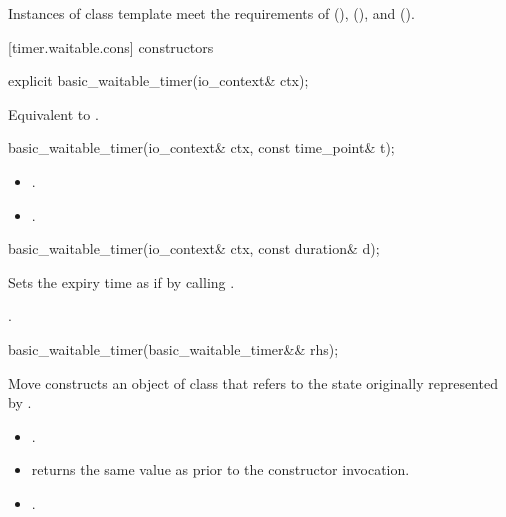 \pnum
Instances of class template  meet the requirements of  (),  (), and  ().


[timer.waitable.cons]{ constructors}

\begin{itemdecl}
explicit basic_waitable_timer(io_context& ctx);
\end{itemdecl}

\begin{itemdescr}
\pnum
\effects Equivalent to .
\end{itemdescr}

\begin{itemdecl}
basic_waitable_timer(io_context& ctx, const time_point& t);
\end{itemdecl}

\begin{itemdescr}
\pnum
\postconditions 
\begin{itemize}
\item
{}.
\item
{}.
\end{itemize}
\end{itemdescr}

\begin{itemdecl}
basic_waitable_timer(io_context& ctx, const duration& d);
\end{itemdecl}

\begin{itemdescr}
\pnum
\effects Sets the expiry time as if by calling .

\pnum
\postconditions {}.
\end{itemdescr}

\begin{itemdecl}
basic_waitable_timer(basic_waitable_timer&& rhs);
\end{itemdecl}

\begin{itemdescr}
\pnum
\effects Move constructs an object of class  that refers to the state originally represented by .

\pnum
\postconditions 
\begin{itemize}
\item
{}.
\item
{} returns the same value as  prior to the constructor invocation.
\item
{}.
\end{itemize}
\end{itemdescr}



